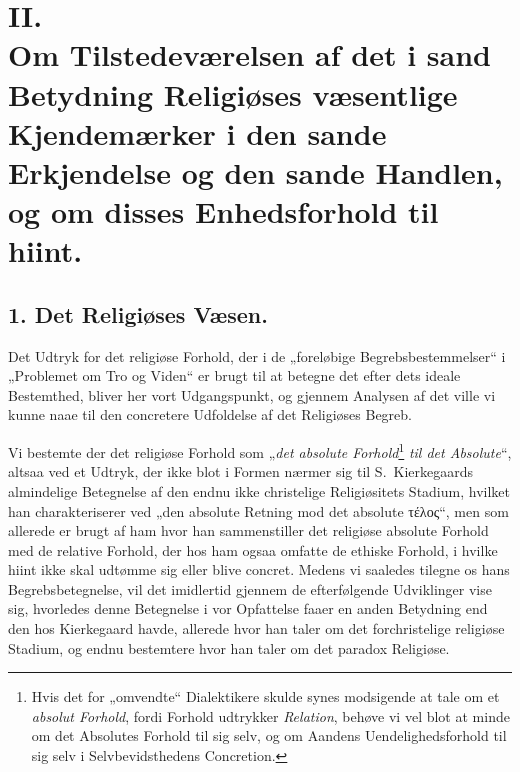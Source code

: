 \chapter*{II.\\ Om Tilstedeværelsen af det i sand Betydning Religiøses væsentlige Kjendemærker i den sande Erkjendelse og den sande Handlen, og om disses Enhedsforhold til hiint.}

 \setcounter{footnote}{0}%
\section*{1. Det Religiøses Væsen.}

Det Udtryk for det religiøse Forhold, der i de „foreløbige
Begrebsbestemmelser“ i „Problemet om Tro og Viden“ er brugt til at betegne
det efter dets ideale Bestemthed, bliver her vort Udgangspunkt, og gjennem
Analysen af det ville vi kunne naae til den concretere Udfoldelse af det
Religiøses Begreb.

Vi bestemte der det religiøse Forhold som „\emph{det absolute
Forhold}\footnote{Hvis det for „omvendte“ Dialektikere skulde synes
modsigende at tale om et \emph{absolut Forhold}, fordi Forhold udtrykker
\emph{Relation}, behøve vi vel blot at minde om det Absolutes Forhold til sig
selv, og om Aandens Uendelighedsforhold til sig selv i Selvbevidsthedens
Concretion.} \emph{til det Absolute}“, altsaa ved et Udtryk, der ikke blot i
Formen nærmer sig til S.\ Kierkegaards almindelige Betegnelse af den endnu
ikke christelige Religiøsitets Stadium, hvilket han charakteriserer ved „den
absolute Retning mod det absolute τέλος“, men som allerede er brugt af ham
hvor han sammenstiller det religiøse absolute Forhold med de relative
Forhold, der hos ham ogsaa omfatte de ethiske Forhold, i hvilke hiint ikke
skal udtømme sig eller blive concret. Medens vi saaledes tilegne os hans
 Begrebsbetegnelse, vil det imidlertid gjennem de efterfølgende Udviklinger
vise sig, hvorledes denne Betegnelse i vor Opfattelse faaer en anden Betydning
end den hos Kierkegaard havde, allerede hvor han taler om det forchristelige
religiøse Stadium, og endnu bestemtere hvor han taler om det paradox
Religiøse.

